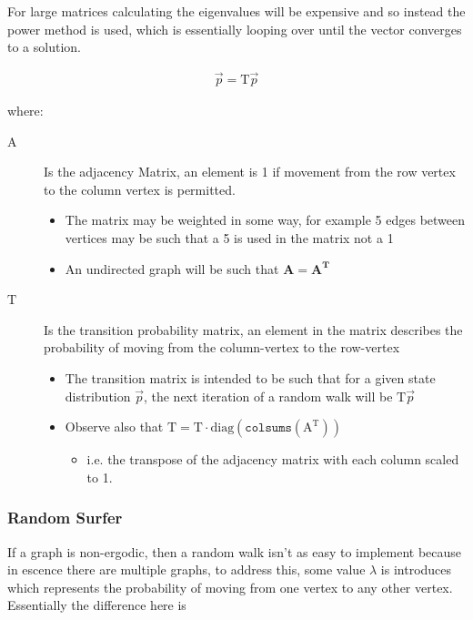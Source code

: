 \documentclass[11pt]{article}
\begin{document}
For large matrices calculating the eigenvalues will be expensive and so instead the power method is used, which is essentially looping over until the vector converges to a solution.

\begin{align}
\vec{p} = \mathrm{T}\vec{p} \label{eq:pageRank-Method}
\end{align}

where:

\begin{description}
\item[{\(\mathrm{A}\)}] Is the adjacency Matrix, an element is 1 if movement from the row vertex to the column vertex is permitted.
\begin{itemize}
\item The matrix may be weighted in some way, for example 5 edges between vertices may be such that a 5 is used in the matrix not a 1
\item An undirected graph will be such that \(\mathbf{A} = \mathbf{A}^{\mathrm{\mathbf{T}}}\)
\end{itemize}
\item[{\(\mathrm{T}\)}] Is the transition probability matrix, an element in the matrix describes the probability of moving from the column-vertex to the row-vertex
\begin{itemize}
\item The transition matrix is intended to be such that for a given state distribution \(\vec{p}\), the next iteration of a random walk will be \(\mathrm{T}\vec{p}\)
\item Observe also that \(\mathrm{T} = \mathrm{T} \cdot \mathrm{diag}(\mathtt{colsums}(\mathrm{A^{\mathrm{T}}}))\)
\begin{itemize}
\item i.e. the transpose of the adjacency matrix with each column scaled to 1.
\end{itemize}
\end{itemize}
\end{description}


\subsubsection{Random Surfer}
\label{sec:orgd71cd63}

If a graph is non-ergodic, then a random walk isn't as easy to implement because in escence there are multiple graphs, to address this, some value \(\lambda\) is introduces which represents the probability of moving from one vertex to any other vertex.
Essentially the difference here is
\end{document}

